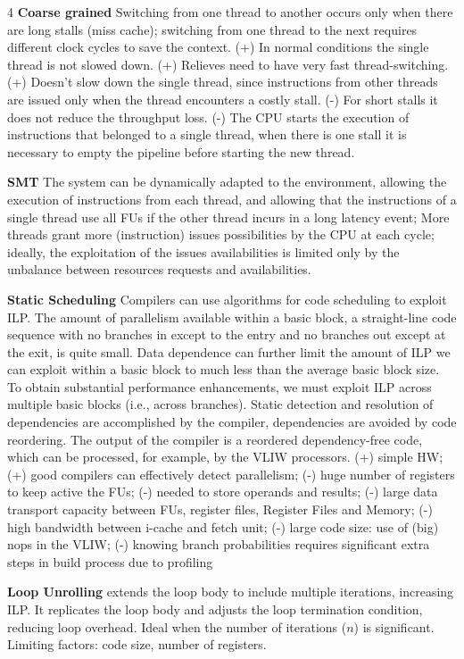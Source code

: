\documentclass[a4paper,landscape]{article}
\begin{document}
\begin{multicols}{4}
\noindent \textbf{Coarse grained} Switching from one thread to another occurs only when there are long stalls (miss cache); switching from one thread to the next requires different clock cycles to save the context. (+) In normal conditions the single thread is not slowed down. (+) Relieves need to have very fast thread-switching. (+) Doesn't slow down the single thread, since instructions from other threads are issued only when the thread encounters a costly stall. (-) For short stalls it does not reduce the throughput loss. (-) The CPU starts the execution of instructions that belonged to a single thread, when there is one stall it is necessary to empty the pipeline before starting the new thread.

\noindent \textbf{SMT} The system can be dynamically adapted to the environment, allowing the execution of instructions from each thread, and allowing that the instructions of a single thread use all FUs if the other thread incurs in a long latency event; More threads grant more (instruction) issues possibilities by the CPU at each cycle; ideally, the exploitation of the issues availabilities is limited only by the unbalance between resources requests and availabilities.

\noindent \textbf{Static Scheduling}
Compilers can use algorithms for code scheduling to exploit ILP. The amount of parallelism available within a basic block, a straight-line code sequence with no branches in except to the entry and no branches out except at the exit, is quite small. Data dependence can further limit the amount of ILP we can exploit within a basic block to much less than the average basic block size. To obtain substantial performance enhancements, we must exploit ILP across multiple basic blocks (i.e., across branches). Static detection and resolution of dependencies are accomplished by the compiler, dependencies are avoided by code reordering. The output of the compiler is a reordered dependency-free code, which can be processed, for example, by the VLIW processors. (+) simple HW; (+) good compilers can effectively detect parallelism;  (-) huge number of registers to keep active the FUs;  (-) needed to store operands and results;  (-) large data transport capacity between FUs, register files, Register Files and Memory; (-) high bandwidth between i-cache and fetch unit; (-) large code size: use of (big) nops in the VLIW; (-) knowing branch probabilities requires significant extra steps in build process due to profiling

\noindent \textbf{Loop Unrolling} extends the loop body to include multiple iterations, increasing ILP. It replicates the loop body and adjusts the loop termination condition, reducing loop overhead. Ideal when the number of iterations ($n$) is significant. Limiting factors: code size, number of registers.


\end{multicols}
\end{document}
